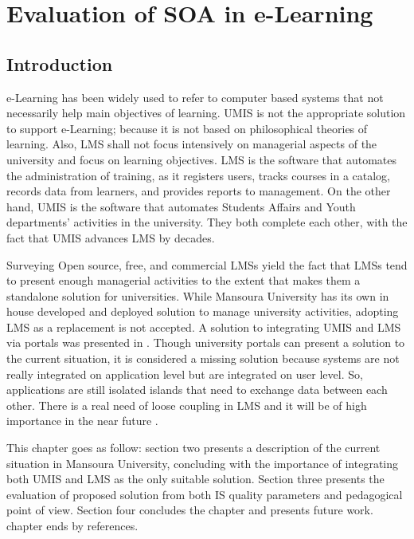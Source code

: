 \documentclass[12pt,a4paper,final,twoside,onecolumn,titlepage]{book}
\begin{document}
\chapter{Evaluation of SOA in e-Learning}
\label{EvaluationOfSOA}
\section{Introduction}
e-Learning has been widely used to refer to computer based systems that not necessarily help main objectives of learning. \gls{UMIS} is not the appropriate solution to support e-Learning; because it is not based on philosophical theories of learning. Also, \gls{LMS} shall not focus intensively on managerial aspects of the university and focus on learning objectives. \gls{LMS} is the software that automates the administration of training, as it registers users, tracks courses in a catalog, records data from learners, and provides reports to management. On the other hand, \gls{UMIS} is the software that automates Students Affairs and Youth departments’ activities in the university. They both complete each other, with the fact that \gls{UMIS} advances \gls{LMS} by decades.

Surveying Open source, free, and commercial \gls{LMS}s yield the fact that \gls{LMS}s tend to present enough managerial activities to the extent that makes them a standalone solution for universities. While Mansoura University has its own in house developed and deployed solution to manage university activities, adopting \gls{LMS} as a replacement is not accepted. A solution to integrating \gls{UMIS} and \gls{LMS} via portals was presented in \cite{EV06}. Though university portals can present a solution to the current situation, it is considered a missing solution because systems are not really integrated on application level but are integrated on user level. So, applications are still isolated islands that need to exchange data between each other. There is a real need of loose coupling in \gls{LMS} and it will be of high importance in the near future \cite{EV07}.

This chapter goes as follow: section two presents a description of the current situation in Mansoura University, concluding with the importance of integrating both \gls{UMIS} and \gls{LMS} as the only suitable solution. Section three presents the evaluation of proposed solution from both \gls{IS} quality parameters and pedagogical point of view. Section four concludes the chapter and presents future work. chapter ends by references.
\end{document}

